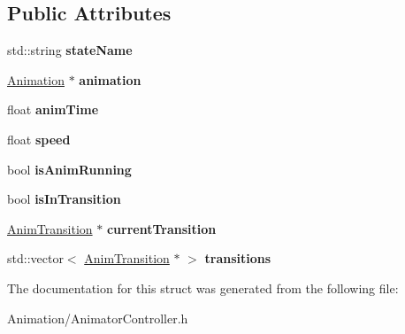 \subsection*{Public Attributes}
\begin{DoxyCompactItemize}
\item 
\mbox{\label{structAnimState_a3fc2bc133d23f7e11646e98b21a509b7}} 
std\+::string {\bfseries state\+Name}
\item 
\mbox{\label{structAnimState_a69e8df8ec31e861fa4313081a0114091}} 
\hyperlink{structAnimation}{Animation} $\ast$ {\bfseries animation}
\item 
\mbox{\label{structAnimState_a83742f16bd6f9650fbc493523d8b5b6c}} 
float {\bfseries anim\+Time}
\item 
\mbox{\label{structAnimState_a25790df877ce752e839f7f4db199f446}} 
float {\bfseries speed}
\item 
\mbox{\label{structAnimState_a6162838804ebe7bbe208d3affa089308}} 
bool {\bfseries is\+Anim\+Running}
\item 
\mbox{\label{structAnimState_a8dbd55f6f675b10fe2449df761018e19}} 
bool {\bfseries is\+In\+Transition}
\item 
\mbox{\label{structAnimState_a5836adc57bcbc24a7c43c9021afec4c0}} 
\hyperlink{structAnimTransition}{Anim\+Transition} $\ast$ {\bfseries current\+Transition}
\item 
\mbox{\label{structAnimState_a11936add4f5684603ddfd767749128b7}} 
std\+::vector$<$ \hyperlink{structAnimTransition}{Anim\+Transition} $\ast$ $>$ {\bfseries transitions}
\end{DoxyCompactItemize}


The documentation for this struct was generated from the following file\+:\begin{DoxyCompactItemize}
\item 
Animation/Animator\+Controller.\+h\end{DoxyCompactItemize}
